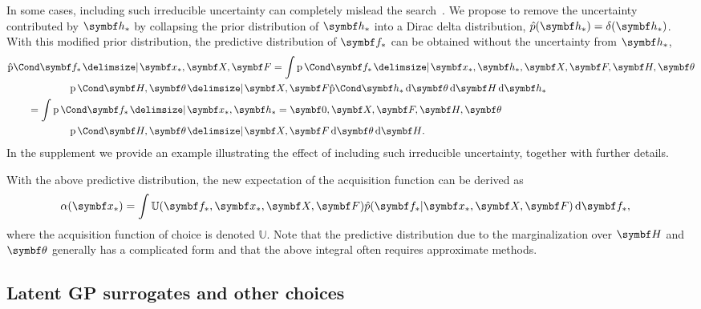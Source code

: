 In some cases, including such irreducible uncertainty can completely mislead the search~\parencite{gonzalez_preferential_2017}.
We propose to remove the uncertainty contributed by $\mat{h}_*$ by collapsing the prior distribution of $\mat{h}_*$ into a Dirac delta distribution, $\hat{p}(\mat{h}_*) = \delta(\mat{h}_*)$.
With this modified prior distribution, the predictive distribution of $\mat{f}_*$ can be obtained without the uncertainty from $\mat{h}_*$,
\begin{align}
    \begin{split}
        \MoveEqLeft\hProb{\mat{f}_* \given \mat{x}_*,  \mat{X}, \mat{F}} =
        \int \Prob{\mat{f}_* \given \mat{x}_*,\mat{h}_*,  \mat{X}, \mat{F},\mat{H}, \mat{\theta}} \\
        &\qquad\qquad\Prob{\mat{H}, \mat{\theta} \given \mat{X}, \mat{F}} \hProb{\mat{h}_*} \diff{\mat{\theta}}\diff{\mat{H}}\diff{\mat{h}_*} \\
        &= \int \Prob{\mat{f}_* \given \mat{x}_*,\mat{h}_*=\mat{0},  \mat{X}, \mat{F},\mat{H}, \mat{\theta}} \\
        &\qquad\qquad\Prob{\mat{H}, \mat{\theta} \given \mat{X}, \mat{F}} \diff{\mat{\theta}}\diff{\mat{H}}.
    \end{split}
\end{align}
In the supplement we provide an example illustrating the effect of including such irreducible uncertainty,
together with further details.

With the above predictive distribution, the new expectation of the acquisition function can be derived as
\begin{align}
    \begin{split}
        \label{eq:bayesian_optimization:utility}
        \MoveEqLeft[1]\alpha(\mat{x}_\ast) =
        \int
        \mathbb{U}(\mat{f}_\ast, \mat{x}_\ast, \mat{X}, \mat{F}) \hat{p}(\mat{f}_\ast | \mat{x}_\ast, \mat{X}, \mat{F}) \diff{\mat{f}_\ast},
    \end{split}
\end{align}
where the acquisition function of choice is denoted $\mathbb{U}$.
Note that the predictive distribution due to the marginalization over $\mat{H}$ and $\mat{\theta}$ generally has a complicated form
and that the above integral often requires approximate methods.

\subsection{Latent GP surrogates and other choices}
\label{toc:bayesian_optimization:latent_gp_surrogate}

